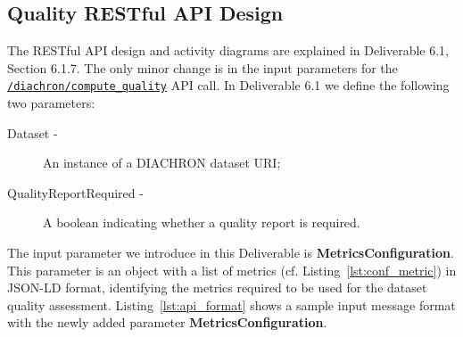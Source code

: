 
\subsection{Quality RESTful API Design}
\label{sec:RestAPI} 
The RESTful API design and activity diagrams are explained in Deliverable 6.1, Section 6.1.7.
The only minor change is in the input parameters for the \texttt{\url{/diachron/compute_quality}} API call.
In Deliverable 6.1 we define the following two parameters:
\begin{description}
\item[Dataset -] An instance of a DIACHRON dataset URI;
\item[QualityReportRequired -] A boolean indicating whether a quality report is required.
\end{description}
The input parameter we introduce in this Deliverable is \textbf{MetricsConfiguration}.
This parameter is an object with a list of metrics (cf. Listing~\ref{lst:conf_metric}) in JSON-LD format, identifying the metrics required to be used for the dataset quality assessment.
Listing~\ref{lst:api_format} shows a sample input message format with the newly added parameter \textbf{MetricsConfiguration}.
 
